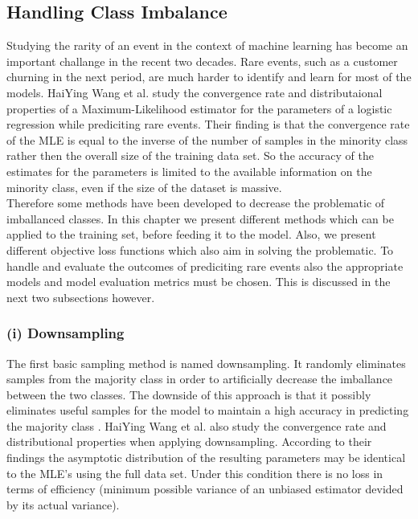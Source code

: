 \documentclass[12pt,titlepage]{article}
\begin{document}
\subsection{Handling Class Imbalance} \par

Studying the rarity of an event in the context of machine learning has become an important challange in the recent two decades. Rare events, such as a customer churning in the next period, are much harder to identify and learn for most of the models. HaiYing Wang et al. \cite{convergence_rareevents} study the convergence rate and distributaional properties of a Maximum-Likelihood estimator for the parameters of a logistic regression while prediciting rare events. Their finding is that the convergence rate of the MLE is equal to the inverse of the number of samples in the minority class rather then the overall size of the training data set. So the accuracy of the estimates for the parameters is limited to the available information on the minority class, even if the size of the dataset is massive. \\
Therefore some methods have been developed to decrease the problematic of imballanced classes. In this chapter we present different methods which can be applied to the training set, before feeding it to the model. Also, we present different objective loss functions which also aim in solving the problematic. To handle and evaluate the outcomes
of prediciting rare events also the appropriate models and model evaluation metrics must be chosen. This is discussed in the next two subsections however. \\

\subsubsection*{(i) Downsampling}

The first basic sampling method is named downsampling. It randomly eliminates samples from the majority class in order to artificially decrease the imballance between the two classes. The downside of this approach is that it possibly eliminates useful samples for the model to maintain a high accuracy in predicting the majority class \cite{mining_rarity}. HaiYing Wang et al. also study the convergence rate and distributional properties when applying downsampling. According to their findings the asymptotic distribution of the resulting parameters may be identical to the MLE's using the full data set. Under this condition there is no loss in terms of efficiency (minimum possible variance of an unbiased estimator devided by its actual variance). \\
\end{document}
